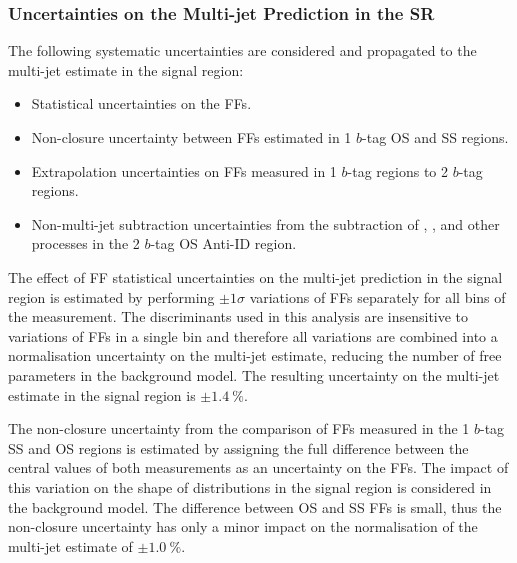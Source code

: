 \subsubsection{Uncertainties on the Multi-jet Prediction in the \hadhad SR}

%

The following systematic uncertainties are considered and propagated
to the multi-jet estimate in the \hadhad signal region:
\begin{itemize}

\item Statistical uncertainties on the FFs.

\item Non-closure uncertainty between FFs estimated in 1 $b$-tag OS and SS
  regions.

\item Extrapolation uncertainties on FFs measured in 1 $b$-tag regions to 2
  $b$-tag regions.

\item Non-multi-jet subtraction uncertainties from the subtraction of
  \ttbar, \ttbarFakes, and other processes in the 2 $b$-tag OS Anti-ID
  region.

\end{itemize}

The effect of FF statistical uncertainties on the multi-jet prediction in the
signal region is estimated by performing $\pm 1 \sigma$ variations of FFs
separately for all bins of the measurement. The discriminants used in this
analysis are insensitive to variations of FFs in a single bin and therefore all
variations are combined into a normalisation uncertainty on the multi-jet
estimate, reducing the number of free parameters in the background model. The
resulting uncertainty on the multi-jet estimate in the signal region is
$\pm \SI{1.4}{\percent}$.

The non-closure uncertainty from the comparison of FFs measured in the 1 $b$-tag
SS and OS regions is estimated by assigning the full difference between the
central values of both measurements as an uncertainty on the FFs. The impact of
this variation on the shape of distributions in the signal region is considered
in the background model. The difference between OS and SS FFs is small, thus the
non-closure uncertainty has only a minor impact on the normalisation of the
multi-jet estimate of $\pm \SI{1.0}{\percent}$.

